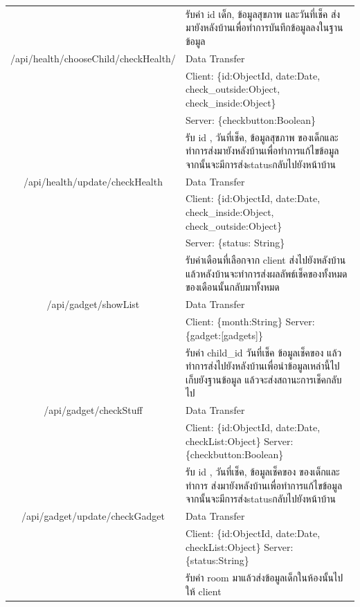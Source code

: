 \begin{landscape}
\begin{tabularx}{\linewidth}{|c|X|}
  & รับค่า id เด็ก, ข้อมูลสุขภาพ และวันที่เช็ค ส่งมายังหลังบ้านเพื่อทำการบันทึกข้อมูลลงในฐานข้อมูล
  \\
  {/api/health/chooseChild/checkHealth/} & Data Transfer
  \\ &Client: \{id:ObjectId, date:Date, check\_outside:Object, check\_inside:Object\}
  \\ &Server: \{checkbutton:Boolean\}
  \\
  \hline

  
  &รับ id , วันที่เช็ค, ข้อมูลสุขภาพ ของเด็กและทำการส่งมายังหลังบ้านเพื่อทำการแก้ไขข้อมูล จากนั้นจะมีการส่งstatusกลับไปยังหน้าบ้าน
  \\
  {/api/health/update/checkHealth}&Data Transfer
  \\ &Client: \{id:ObjectId, date:Date, check\_inside:Object, check\_outside:Object\}
  \\ &Server: \{status: String\}
  \\
  \hline
   & รับค่าเดือนที่เลือกจาก client ส่งไปยังหลังบ้าน แล้วหลังบ้านจะทำการส่งผลลัพธ์เช็คของทั้งหมดของเดือนนั้นกลับมาทั้งหมด
  \\
  
  {/api/gadget/showList}& Data Transfer
  \\ &Client: \{month:String\}
  Server:\{gadget:[gadgets]\}
  \\ 
  \hline

    

  \hline
  
   & รับค่า child\_id วันที่เช็ค ข้อมูลเช็คของ 
   แล้วทำการส่งไปยังหลังบ้านเพื่อนำข้อมูลเหล่านี้ไป
   เก็บยังฐานข้อมูล แล้วจะส่งสถานะการเช็คกลับไป
  \\
  
  {/api/gadget/checkStuff}& Data Transfer
  \\ &Client: \{id:ObjectId, date:Date, checkList:Object\}
  Server: \{checkbutton:Boolean\}
  \\ 
  \hline

  \hline
  & รับ id , วันที่เช็ค, ข้อมูลเช็คของ ของเด็กและทำการ
  ส่งมายังหลังบ้านเพื่อทำการแก้ไขข้อมูล 
  จากนั้นจะมีการส่งstatusกลับไปยังหน้าบ้าน
  \\ {/api/gadget/update/checkGadget} & Data Transfer
  \\ & Client: \{id:ObjectId, date:Date, checkList:Object\}
  Server: \{status:String\} \\
  \hline

  \hline
  
   & รับค่า room มาแล้วส่งข้อมูลเด็กในห้องนั้นไปให้ client
  \\
  

\end{tabularx}
\end{landscape}
